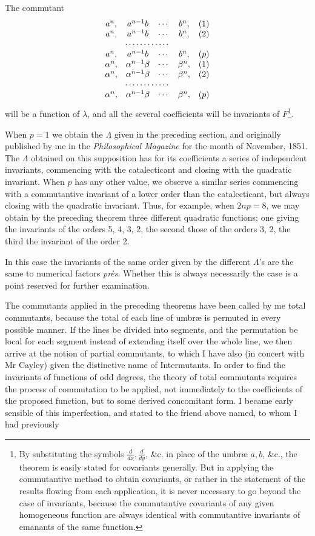 \documentclass[11pt]{article}
\newcommand{\sourcepage}[1]{\marginpar{\scriptsize p.~#1}}
\begin{document}
{{\sourcepage{317}
The commutant
\[
\begin{array}{ccccr}
a^n,&a^{n-1}b&\cdots&b^n,&(1)\\
a^n,&a^{n-1}b&\cdots&b^n,&(2)\\
\multicolumn{4}{c}{\cdots\cdots\cdots\cdots}&\\
a^n,&a^{n-1}b&\cdots&b^n,&(p)\\
\alpha^n,&\alpha^{n-1}\beta&\cdots&\beta^n,&(1)\\
\alpha^n,&\alpha^{n-1}\beta&\cdots&\beta^n,&(2)\\
\multicolumn{4}{c}{\cdots\cdots\cdots\cdots}&\\
\alpha^n,&\alpha^{n-1}\beta&\cdots&\beta^n,&(p)
\end{array}
\]
will be a function of $\lambda$, and all the several coefficients will be invariants of $F$\footnote{By substituting the symbols $\frac{d}{dx},\frac{d}{dy}$, \&c. in place of the umbræ $a,b$, \&c., the theorem is easily stated for covariants generally. But in applying the commutantive method to obtain covariants, or rather in the statement of the results flowing from each application, it is never necessary to go beyond the case of invariants, because the commutantive covariants of any given homogeneous function are always identical with commutantive invariants of emanants of the same function.}.

When $p=1$ we obtain the $\Lambda$ given in the preceding section, and originally published by me in the \emph{Philosophical Magazine} for the month of November, 1851. The $\Lambda$ obtained on this supposition has for its coefficients a series of independent invariants, commencing with the catalecticant and closing with the quadratic invariant. When $p$ has any other value, we observe a similar series commencing with a commutantive invariant of a lower order than the catalecticant, but always closing with the quadratic invariant. Thus, for example, when $2np=8$, we may obtain by the preceding theorem three different quadratic functions; one giving the invariants of the orders 5, 4, 3, 2, the second those of the orders 3, 2, the third the invariant of the order 2.

In this case the invariants of the same order given by the different $\Lambda$'s are the same to numerical factors \emph{près}. Whether this is always necessarily the case is a point reserved for further examination.

The commutants applied in the preceding theorems have been called by me total commutants, because the total of each line of umbræ is permuted in every possible manner. If the lines be divided into segments, and the permutation be local for each segment instead of extending itself over the whole line, we then arrive at the notion of partial commutants, to which I have also (in concert with Mr Cayley) given the distinctive name of Intermutants. In order to find the invariants of functions of odd degrees, the theory of total commutants requires the process of commutation to be applied, not immediately to the coefficients of the proposed function, but to some derived concomitant form. I became early sensible of this imperfection, and stated to the friend above named, to whom I had previously

}}
\end{document}
